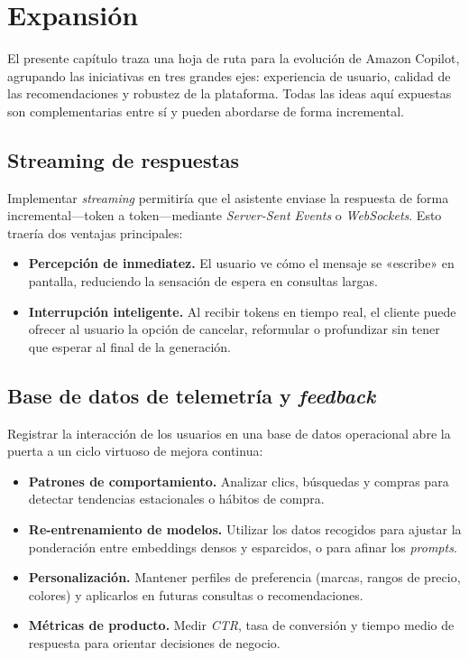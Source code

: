 \section{Expansión}

El presente capítulo traza una hoja de ruta para la evolución de Amazon Copilot, agrupando las iniciativas en tres grandes ejes: experiencia de usuario, calidad de las recomendaciones y robustez de la plataforma. Todas las ideas aquí expuestas son complementarias entre sí y pueden abordarse de forma incremental.

\subsection{Streaming de respuestas}

Implementar \textit{streaming} permitiría que el asistente enviase la respuesta de forma incremental—token a token—mediante \textit{Server-Sent Events} o \textit{WebSockets}.
Esto traería dos ventajas principales:

\begin{itemize}
    \item \textbf{Percepción de inmediatez.} El usuario ve cómo el mensaje se «escribe» en pantalla, reduciendo la sensación de espera en consultas largas.
    \item \textbf{Interrupción inteligente.} Al recibir tokens en tiempo real, el cliente puede ofrecer al usuario la opción de cancelar, reformular o profundizar sin tener que esperar al final de la generación.
\end{itemize}

\subsection{Base de datos de telemetría y \textit{feedback}}

Registrar la interacción de los usuarios en una base de datos operacional abre la puerta a un ciclo virtuoso de mejora continua:

\begin{itemize}
    \item \textbf{Patrones de comportamiento.} Analizar clics, búsquedas y compras para detectar tendencias estacionales o hábitos de compra.
    \item \textbf{Re-entrenamiento de modelos.} Utilizar los datos recogidos para ajustar la ponderación entre embeddings densos y esparcidos, o para afinar los \emph{prompts}.
    \item \textbf{Personalización.} Mantener perfiles de preferencia (marcas, rangos de precio, colores) y aplicarlos en futuras consultas o recomendaciones.
    \item \textbf{Métricas de producto.} Medir \emph{CTR}, tasa de conversión y tiempo medio de respuesta para orientar decisiones de negocio.
\end{itemize}

